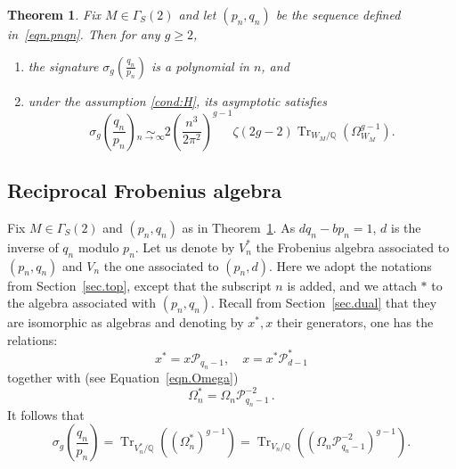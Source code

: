 \documentclass{amsart}
\newcommand{\Q}{\mathbb{Q}}
\DeclareMathOperator{\Tr}{Tr}
\def\calP{\mathcal{P}}
\newtheorem{Theorem}{Theorem}[section]
\theoremstyle{definition}
\begin{document}
\begin{Theorem}\label{mainsign}
Fix $M \in \Gamma_S(2)$ and let $(p_n,q_n)$ be the sequence defined in~\eqref{eqn.pnqn}. Then for any $g\ge 2$, 
\begin{enumerate}
    \item the signature $\sigma_g(\frac{q_n}{p_n})$ is a polynomial in $n$, and
    \item under the assumption \eqref{cond:H}, its asymptotic satisfies
$$\sigma_g \left(\frac{q_n}{p_n}\right)\underset{n\to\infty}{\sim}2\left(\frac{n^3}{2\pi^2}\right)^{g-1}\zeta(2g-2)\Tr_{W_M/\Q}\left(\Omega_{W_M}^{g-1}\right).$$
\end{enumerate}
\end{Theorem}

\subsection{Reciprocal Frobenius algebra}

Fix $M \in \Gamma_S(2)$ and $(p_n,q_n)$ as in Theorem~\ref{mainsign}. As $d q_n-b p_n=1$, $d$ is the inverse of $q_n$ modulo $p_n$. 
Let us denote by $V^*_n$ the Frobenius algebra associated to $(p_n,q_n)$ and $V_n$ the one associated to $(p_n,d)$. Here we adopt the notations from Section~\ref{sec.top}, except that the subscript $n$ is added, and we attach $\ast$ to the algebra associated with $(p_n, q_n)$. Recall from  Section~\ref{sec.dual} that they are isomorphic as algebras and denoting by $x^*,x$ their generators, one has the relations: 
$$x^*=x\calP_{q_n-1},\quad x=x^*\calP^*_{d-1}$$
together with (see Equation~\eqref{eqn.Omega})
$$\Omega^*_n=\Omega_n {\calP}_{q_n-1}^{-2}\,.$$
It follows that  
$$\sigma_g\left(\frac{q_n}{p_n}\right)=\Tr_{V^*_n/\Q} \left((\Omega^*_n)^{g-1}\right)=\Tr_{V_n/\Q} \left((\Omega_n \calP_{q_n-1}^{-2})^{g-1}\right).$$

\end{document}
